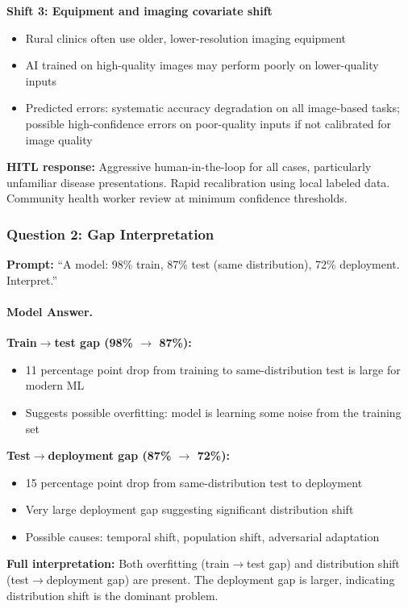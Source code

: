 \textbf{Shift 3: Equipment and imaging covariate shift}
\begin{itemize}
    \item Rural clinics often use older, lower-resolution imaging equipment
    \item AI trained on high-quality images may perform poorly on lower-quality inputs
    \item Predicted errors: systematic accuracy degradation on all image-based tasks; possible high-confidence errors on poor-quality inputs if not calibrated for image quality
\end{itemize}

\textbf{HITL response:} Aggressive human-in-the-loop for all cases, particularly unfamiliar disease presentations. Rapid recalibration using local labeled data. Community health worker review at minimum confidence thresholds.

\subsubsection{Question 2: Gap Interpretation}

\textbf{Prompt:} ``A model: 98\% train, 87\% test (same distribution), 72\% deployment. Interpret.''

\paragraph{Model Answer.}

\textbf{Train$\to$test gap (98\% $\to$ 87\%):}
\begin{itemize}
    \item 11 percentage point drop from training to same-distribution test is large for modern ML
    \item Suggests possible overfitting: model is learning some noise from the training set
\end{itemize}

\textbf{Test$\to$deployment gap (87\% $\to$ 72\%):}
\begin{itemize}
    \item 15 percentage point drop from same-distribution test to deployment
    \item Very large deployment gap suggesting significant distribution shift
    \item Possible causes: temporal shift, population shift, adversarial adaptation
\end{itemize}

\textbf{Full interpretation:}
Both overfitting (train$\to$test gap) and distribution shift (test$\to$deployment gap) are present. The deployment gap is larger, indicating distribution shift is the dominant problem.

